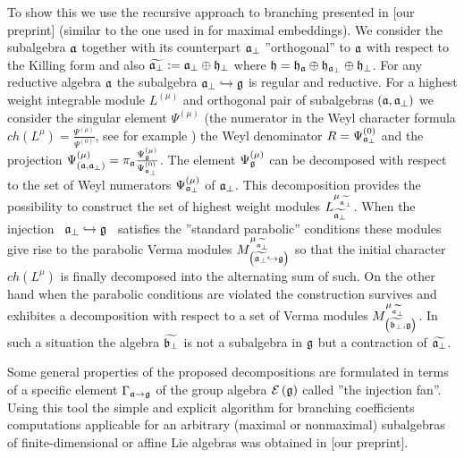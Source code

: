 \documentclass[12pt]{article}
\theoremstyle{definition}
\begin{document}
To show this we use the recursive approach to branching presented in [our
preprint] (similar to the one used in \cite{ilyin812pbc} for maximal
embeddings). We consider the subalgebra $\frak{a}$ together with its
counterpart $\frak{a}_{\bot }$ ''orthogonal'' to $\frak{a}$ with respect to
the Killing form and also $\widetilde{\frak{a}_{\perp }}:=\frak{a}_{\perp
}\oplus \frak{h}_{\perp }$ where $\frak{h}=\frak{\frak{h}_{\frak{a}}}\oplus 
\frak{h}_{\frak{a}_{\perp }}\oplus \frak{h}_{\perp }$. For any reductive
algebra $\frak{a}$ the subalgebra $\frak{a}_{\bot }\hookrightarrow \frak{g}$
is regular and reductive. For a highest weight integrable module $L^{\left(
\mu \right) }$ and orthogonal pair of subalgebras $\left( \frak{a},\frak{a}%
_{\bot }\right) $ we consider the singular element $\Psi ^{\left( \mu
\right) }$ (the numerator in the Weyl character formula $ch\left( L^{\mu
}\right) =\frac{\Psi ^{\left( \mu \right) }}{\Psi ^{\left( 0\right) }}$, see
for example \cite{humphreys1997introduction}) the Weyl denominator $R=\Psi _{%
\frak{a}_{\bot }}^{\left( 0\right) }$ and the projection $\Psi _{\left( 
\frak{a},\frak{a}_{\bot }\right) }^{\left( \mu \right) }=\pi _{\frak{a}}%
\frac{\Psi _{\frak{g}}^{\left( \mu \right) }}{\Psi _{\frak{a}_{\bot
}}^{\left( 0\right) }}$. The element $\Psi _{\frak{g}}^{\left( \mu \right) }$
can be decomposed with respect to the set of Weyl numerators $\Psi _{\frak{a}%
_{\bot }}^{\left( \mu \right) }$ of $\frak{a}_{\bot }$. This decomposition
provides the possibility to construct the set of highest weight modules $L_{%
\widetilde{\frak{a}_{\perp }}}^{\mu _{\widetilde{\frak{a}_{\perp }}}}$. When
the injection \ $\frak{a}_{\bot }\hookrightarrow \frak{g}$ \ satisfies the
''standard parabolic'' conditions these modules give rise to the parabolic
Verma modules $M_{\left( \widetilde{\frak{a}_{\perp }}\hookrightarrow \frak{g%
}\right) }^{\mu _{\widetilde{\frak{a}_{\perp }}}}$ so that the initial
character $ch\left( L^{\mu }\right) $ is finally decomposed into the
alternating sum of such. On the other hand when the parabolic conditions are
violated the construction survives and exhibites a decomposition with
respect to a set of Verma modules $M_{\left( \widetilde{\frak{b}_{\perp }},%
\frak{g}\right) }^{\mu _{\widetilde{\frak{a}_{\perp }}}}$. In such a
situation the algebra $\widetilde{\frak{b}_{\perp }}$ is not a subalgebra in 
$\frak{g}$ but a contraction of $\widetilde{\frak{a}_{\perp }}$.

Some general properties of the proposed decompositions are formulated in
terms of a specific element $\Gamma _{\frak{a}\rightarrow \frak{g}}$ of the
group algebra $\mathcal{E}\left( \frak{g}\right) $ called ''the injection
fan''. Using this tool the simple and explicit algorithm for branching
coefficients computations applicable for an arbitrary (maximal or
nonmaximal) subalgebras of finite-dimensional or affine Lie algebras was
obtained in [our preprint].
\end{document}
